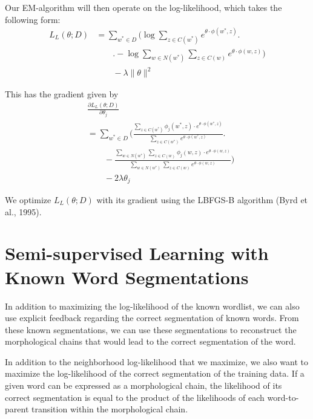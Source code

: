 \documentclass[11pt,twocolumn]{article}
\begin{document}
Our EM-algorithm will then operate on the log-likelihood, which takes the following form:
\begin{equation}
    \begin{split}
        L_L(\theta; D) &= \sum_{w^*\in D} \Bigg(\log \sum_{z\in C(w^*)} e^{\theta\cdot\phi(w^*,z)} \Bigg.\\
        &\qquad\Bigg. -\log \sum_{w\in N(w^*)} \sum_{z\in C(w)} e^{\theta\cdot\phi(w,z)} \Bigg) \\
        &\qquad - \lambda \|\theta\|^2
    \end{split}
\end{equation}

This has the gradient given by
\begin{equation}
    \begin{split}
        &\frac{\partial L_L(\theta; D)}{\partial \theta_j} \\
        &= \sum_{w^*\in D} \Bigg( \frac{\sum_{z\in C(w^*)} \phi_j(w^*,z)\cdot e^{\theta\cdot\phi(w^*,z)}} {\sum_{z\in C(w^*)} e^{\theta\cdot\phi(w^*,z)}} \Bigg. \\
        &\qquad -\frac{\sum_{w\in N(w^*)} \sum_{z\in C(w)} \phi_j(w,z)\cdot e^{\theta\cdot\phi(w,z)}} {\sum_{w\in N(w^*)} \sum_{z\in C(w)} e^{\theta\cdot\phi(w,z)}} \Bigg) \\
        &\qquad -2\lambda\theta_j
    \end{split}
\end{equation}

We optimize $L_L(\theta; D)$ with its gradient using the LBFGS-B algorithm (Byrd et al., 1995).

\section{Semi-supervised Learning with Known Word Segmentations}
In addition to maximizing the log-likelihood of the known wordlist,
we can also use explicit feedback regarding the correct segmentation of known words.
From these known segmentations, we can use these segmentations to reconstruct
the morphological chains that would lead to the correct segmentation of the word.

In addition to the neighborhood log-likelihood that we maximize,
we also want to maximize the log-likelihood of the correct segmentation of the training data.
If a given word can be expressed as a morphological chain, the likelihood of its correct segmentation
is equal to the product of the likelihoods of each word-to-parent transition within the morphological chain.
\end{document}
